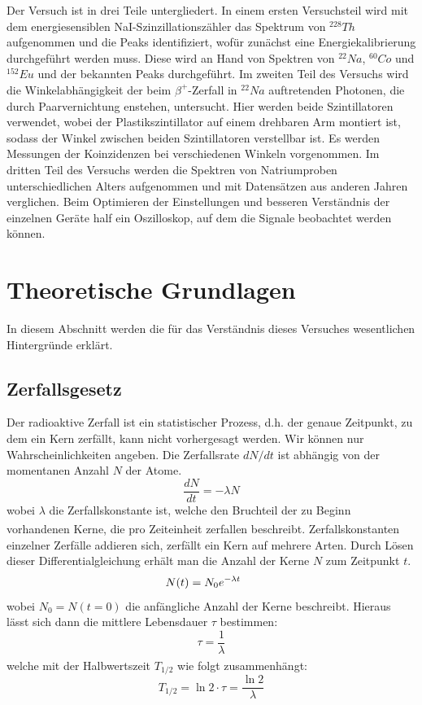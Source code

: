 \documentclass[12pt,listof=totoc]{scrartcl}
\begin{document}
Der Versuch ist in drei Teile untergliedert. 
In einem ersten Versuchsteil wird mit dem energiesensiblen NaI-Szinzillationszähler das Spektrum von  $^{228}Th$ aufgenommen und die Peaks identifiziert, wofür zunächst eine Energiekalibrierung durchgeführt werden muss. Diese wird an Hand von Spektren von  $^{22}Na$, $^{60}Co$ und $^{152}Eu$ und der bekannten Peaks durchgeführt.
Im zweiten Teil des Versuchs wird die Winkelabhängigkeit der beim $\beta^{+}$-Zerfall in  $^{22}Na$ auftretenden Photonen, die durch Paarvernichtung enstehen, untersucht. Hier werden beide Szintillatoren verwendet, wobei der Plastikszintillator auf einem drehbaren Arm montiert ist, sodass der Winkel zwischen beiden Szintillatoren verstellbar ist. Es werden Messungen der Koinzidenzen bei verschiedenen Winkeln vorgenommen.
Im dritten Teil des Versuchs werden die Spektren von Natriumproben unterschiedlichen Alters aufgenommen und mit Datensätzen aus anderen Jahren verglichen.
Beim Optimieren der Einstellungen und besseren Verständnis der einzelnen Geräte half ein Oszilloskop, auf dem die Signale beobachtet werden können.



\newpage
\section{Theoretische Grundlagen}

In diesem Abschnitt werden die für das Verständnis dieses Versuches wesentlichen Hintergründe erklärt.

\subsection{Zerfallsgesetz\label{zerfallsgesetz}}
Der radioaktive Zerfall ist ein statistischer Prozess, d.h. der genaue Zeitpunkt, zu dem ein Kern zerfällt, kann nicht vorhergesagt werden. Wir können nur Wahrscheinlichkeiten angeben. Die Zerfallsrate $dN/dt$ ist abhängig von der momentanen Anzahl $N$ der Atome.
\[\frac{dN}{dt}=-\lambda N\]
wobei $\lambda$ die Zerfallskonstante ist, welche den Bruchteil der zu Beginn vorhandenen Kerne, die pro Zeiteinheit zerfallen beschreibt\textsuperscript{\cite{Demtröder}}. Zerfallskonstanten einzelner Zerfälle addieren sich, zerfällt ein Kern auf mehrere Arten. Durch Lösen dieser Differentialgleichung erhält man die Anzahl der Kerne $N$ zum Zeitpunkt $t$.
\[N(t)=N_0e^{-\lambda t}\hspace{0.5cm}\]
wobei $N_0=N(t=0)$ die anfängliche Anzahl der Kerne beschreibt. Hieraus lässt sich dann die mittlere Lebensdauer $\tau$ bestimmen:
\[\tau=\frac{1}{\lambda}\]
welche mit der Halbwertszeit $T_{1/2}$ wie folgt zusammenhängt:\textsuperscript{\cite{Demtröder}}
\[T_{1/2} = \ln2\cdot \tau = \frac{\ln2}{\lambda}\]
 
\end{document}
